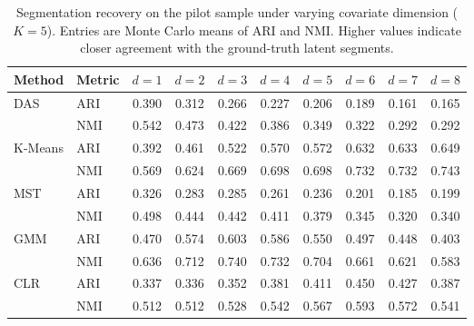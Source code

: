 \begin{table}[htbp]
\centering
\caption{Segmentation recovery on the pilot sample under varying covariate dimension ($K=5$). Entries are Monte Carlo means of ARI and NMI. Higher values indicate closer agreement with the ground-truth latent segments.}
\label{tab:app-ari-nmi-varying-d}
\begin{tabular}{llcccccccc}
\toprule
Method & Metric & $d=1$ & $d=2$ & $d=3$ & $d=4$ & $d=5$ & $d=6$ & $d=7$ & $d=8$ \\
\midrule
DAS & ARI & 0.390 & 0.312 & 0.266 & 0.227 & 0.206 & 0.189 & 0.161 & 0.165 \\
 & NMI & 0.542 & 0.473 & 0.422 & 0.386 & 0.349 & 0.322 & 0.292 & 0.292 \\
\addlinespace
K-Means & ARI & 0.392 & 0.461 & 0.522 & 0.570 & 0.572 & 0.632 & 0.633 & 0.649 \\
 & NMI & 0.569 & 0.624 & 0.669 & 0.698 & 0.698 & 0.732 & 0.732 & 0.743 \\
\addlinespace
MST & ARI & 0.326 & 0.283 & 0.285 & 0.261 & 0.236 & 0.201 & 0.185 & 0.199 \\
 & NMI & 0.498 & 0.444 & 0.442 & 0.411 & 0.379 & 0.345 & 0.320 & 0.340 \\
\addlinespace
GMM & ARI & 0.470 & 0.574 & 0.603 & 0.586 & 0.550 & 0.497 & 0.448 & 0.403 \\
 & NMI & 0.636 & 0.712 & 0.740 & 0.732 & 0.704 & 0.661 & 0.621 & 0.583 \\
\addlinespace
CLR & ARI & 0.337 & 0.336 & 0.352 & 0.381 & 0.411 & 0.450 & 0.427 & 0.387 \\
 & NMI & 0.512 & 0.512 & 0.528 & 0.542 & 0.567 & 0.593 & 0.572 & 0.541 \\
\bottomrule
\end{tabular}
\end{table}

